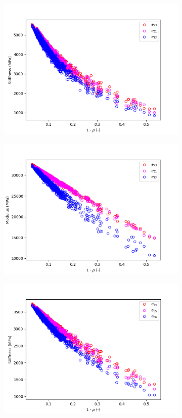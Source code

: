 \documentclass[a4paper,fleqn]{DC_ArtStyle}
\begin{document}
\begin{figure}
\begin{subfigure}[b]{0.45\linewidth}
			\includegraphics[width=\linewidth]{LambdaijStiffness_Isotropic}
		\end{subfigure}
		\begin{subfigure}[b]{0.45\linewidth}
			\includegraphics[width=\linewidth]{LambdaijModulus_Isotropic}
		\end{subfigure}
		\begin{subfigure}[b]{0.45\linewidth}
			\includegraphics[width=\linewidth]{MuijStiffness_Isotropic}

\end{subfigure}
\end{figure}
\end{document}
